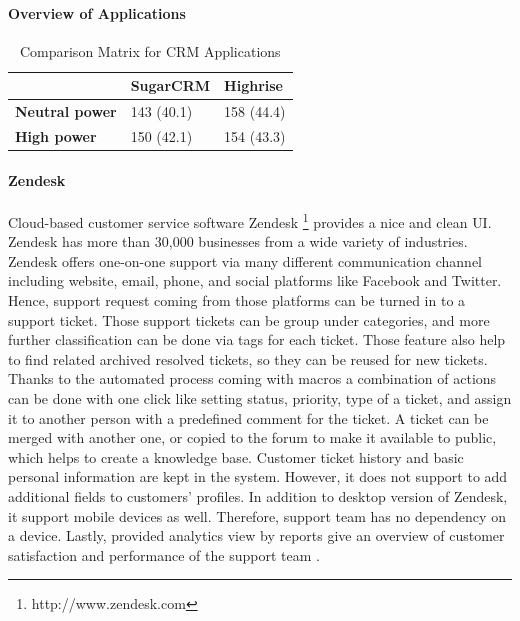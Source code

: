 \paragraph{Overview of Applications}

\begin{table}[!ht]
\begin{center}
	\caption[Comparison Matrix for CRM Applications]{Comparison Matrix for CRM Applications} \label{tab:comp_matr_crm}
    \begin{tabular}{ p{3cm} p{3cm}  p{3cm} }
	\hline
	& \textbf{SugarCRM} & \textbf{Highrise} \\ \hline
	\textbf{Neutral power} & 143 (40.1) & 158 (44.4) \\
	\textbf{High power} & 150 (42.1) & 154 (43.3) \\ \hline
    \end{tabular}
\end{center}
\end{table}

\paragraph{Zendesk}
Cloud-based customer service software Zendesk \footnote{http://www.zendesk.com} provides a nice and clean \ac{UI}. Zendesk has more than 30,000 businesses from a wide variety of industries. Zendesk offers one-on-one support via many different communication channel including website, email, phone, and social platforms like Facebook and Twitter. Hence, support request coming from those platforms can be turned in to a support ticket. Those support tickets can be group under categories, and more further classification can be done via tags for each ticket. Those feature also help to find related archived resolved tickets, so they can be reused for new tickets. Thanks to the automated process coming with macros a combination of actions can be done with one click like setting status, priority, type of a ticket, and assign it to another person with a predefined comment for the ticket. A ticket can be merged with another one, or copied to the forum to make it available to public, which helps to create a knowledge base. Customer ticket history and basic personal information are kept in the system. However, it does not support to add additional fields to customers' profiles. In addition to desktop version of Zendesk, it support mobile devices as well. Therefore, support team has no dependency on a device. Lastly, provided analytics view by reports give an overview of customer satisfaction and performance of the support team \citep{Zendesk2013,Zendesk2013a}.

